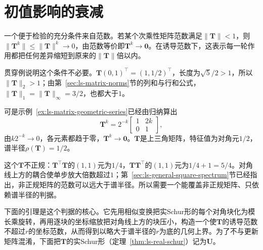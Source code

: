 \section{初值影响的衰减}
\label{sec:ls-matrix-power-behavior}
\label{sec:linear-algebra-power-convergence}

一个便于检验的充分条件来自范数。若某个次乘性矩阵范数满足$\lVert\bm T\rVert<1$，则$\lVert\bm T^k\rVert\leq\lVert\bm T\rVert^k\to0$，由范数等价即$\bm T^k\to\bm0$。在诱导范数下，这表示每一轮作用都把任何差异缩短到原来的$\lVert\bm T\rVert$倍以内。

贯穿例说明这个条件不必要。$\bm T(0,1)^\top=(1,1/2)^\top$，长度为$\sqrt5/2>1$，所以$\lVert\bm T\rVert_2>1$；由第~\ref{sec:ls-matrix-norms}节的列和与行和公式，$\lVert\bm T\rVert_1=\lVert\bm T\rVert_\infty=3/2$，也都大于$1$。

可是示例~\ref{ex:ls-matrix-geometric-series}已经由归纳算出
\[
 \bm T^k=2^{-k}\begin{bmatrix}1&2k\\0&1\end{bmatrix},
\]
由$k2^{-k}\to0$，各元素都趋于零，$\bm T^k\to\bm0$。$\bm T$是上三角矩阵，特征值为对角元$1/2$，谱半径$\rho(\bm T)=1/2$。

这个$\bm T$不正规：$\bm T^\top\bm T$的$(1,1)$元为$1/4$，$\bm T\bm T^\top$的$(1,1)$元为$1/4+1=5/4$。对角线上方的耦合使单步放大倍数超过$1$；第~\ref{sec:ls-general-square-spectrum}节已经指出，非正规矩阵的范数可以远大于谱半径。所以需要一个能覆盖非正规矩阵、只依赖谱半径的判据。

下面的引理是这个判据的核心。它先用相似变换把实Schur形的每个对角块化为模长乘旋转，再用逐块的坐标缩放把对角线上方的块压小，构造一个使$\bm T$的诱导范数不超过$r$的坐标范数，从而得到以略大于谱半径的$r$为底的几何上界。为了不与更新矩阵混淆，下面把$\bm T$的实Schur形（定理~\ref{thm:ls-real-schur}）记为$\bm U$。

